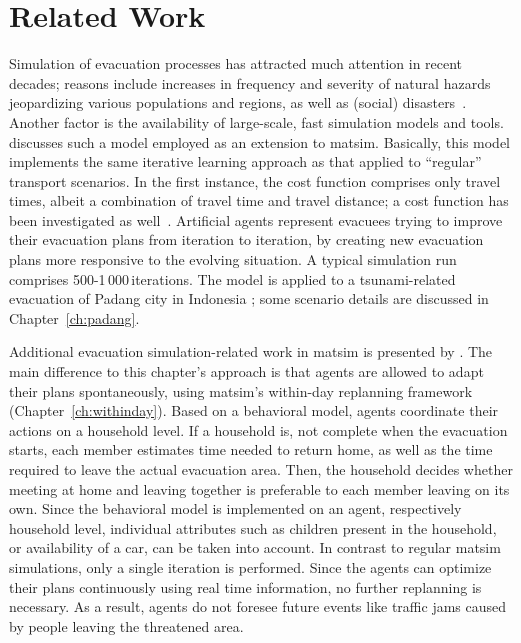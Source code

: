 \section{Related Work}
Simulation of evacuation processes has attracted much attention in recent decades; reasons include increases in frequency and severity of natural hazards jeopardizing various populations and regions, as well as (social) disasters~\citep{Rodr2006HBoDisasterResearch}. Another factor is the availability of large-scale, fast simulation models and tools. \citet{Laemmel_PhDThesis_2011} discusses such a model employed as an extension to \gls{matsim}. Basically, this model implements the same iterative learning approach as that applied to ``regular'' transport scenarios. In the first instance, the cost function comprises only travel times, albeit a combination of travel time and travel distance; a cost function has been investigated as well~\citep{00LaemmelKluepfelNagel2009EvacPadangAtBookTimmermanns}. 
Artificial agents represent evacuees trying to improve their evacuation plans from iteration to iteration, by creating new evacuation plans more responsive to the evolving situation. 
A typical simulation run comprises 500-1\,000\,iterations. 
The model is applied to a tsunami-related evacuation of Padang city in Indonesia \citep[e.g.,][]{00TaubenboeckEtAl2012ConcludingLastMilePaperNatHazards,00GosebergEtAl2012LastLastMile}; some scenario details are discussed in Chapter~\ref{ch:padang}. 

Additional evacuation simulation-related work in \gls{matsim} is presented by \citet{Dobler_PhDThesis_2013}. The main difference to this chapter's approach is that agents are allowed to adapt their plans spontaneously, using \gls{matsim}'s within-day replanning framework \citep{DoblerEtAl_TRR_2012} (Chapter~\ref{ch:withinday}). 
Based on a behavioral model, agents coordinate their actions on a household level. If a household is, \eg not complete when the evacuation starts, each member estimates time needed to return home, as well as the time required to leave the actual evacuation area. Then, the household decides whether meeting at home and leaving together is preferable to each member leaving on its own.
Since the behavioral model is implemented on an agent, respectively household level, individual attributes such as children present in the household, or availability of a car, can be taken into account.
In contrast to regular \gls{matsim} simulations, only a single iteration is performed. Since the agents can optimize their plans continuously using real time information, no further replanning is necessary. As a result, agents do not foresee future events like traffic jams caused by people leaving the threatened area.

